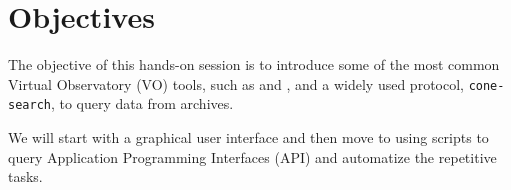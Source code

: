 \section*{Objectives}


The objective of this hands-on session is to introduce some of the most common
Virtual Observatory (VO) tools, such as 
\aladin \citep{2000A&AS..143...33B} and
\topcat \citep{2005ASPC..347...29T}, and 
a widely used protocol,
\texttt{cone-search},
to query data from archives.

We will start with a graphical user interface and then move to
using \python scripts to query Application Programming Interfaces (API)
and automatize the repetitive tasks.

